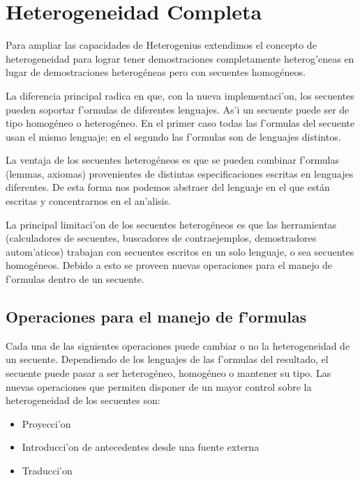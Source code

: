 \section{Heterogeneidad Completa}
\label{sec:heterogeneidad-verdadera}

Para ampliar las capacidades de Heterogenius extendimos el concepto de heterogeneidad para lograr tener demostraciones completamente heterog'eneas en lugar de demostraciones heterogéneas pero con secuentes homogéneos. 

La diferencia principal radica en que, con la nueva implementaci'on, los secuentes pueden soportar f'ormulas de diferentes lenguajes. As'i un secuente puede ser de tipo homogéneo o heterogéneo. En el primer caso todas las f'ormulas del secuente usan el mismo lenguaje; en el segundo las f'ormulas son de lenguajes distintos.

La ventaja de los secuentes heterogéneos es que se pueden combinar f'ormulas (lemmas, axiomas) provenientes de distintas especificaciones escritas en lenguajes diferentes. De esta forma nos podemos abstraer del lenguaje en el que están escritas y concentrarnos en el an'alisis.

La principal limitaci'on de los secuentes heterogéneos es que las herramientas (calculadores de secuentes, buscadores de contraejemplos, demostradores autom'aticos) trabajan con secuentes escritos en un solo lenguaje, o sea secuentes homogéneos. Debido a esto se proveen nuevas operaciones para el manejo de f'ormulas dentro de un secuente.

\subsection{Operaciones para el manejo de f'ormulas}

Cada una de las siguientes operaciones puede cambiar o no la heterogeneidad de un secuente.  Dependiendo de los lenguajes de las f'ormulas del resultado, el secuente puede pasar a ser heterogéneo, homogéneo o mantener su tipo. Las nuevas operaciones que permiten disponer de un mayor control sobre la heterogeneidad de los secuentes son:

\begin{itemize}
\item Proyecci'on
\item Introducci'on de antecedentes desde una fuente externa
\item Traducci'on
\end{itemize}

